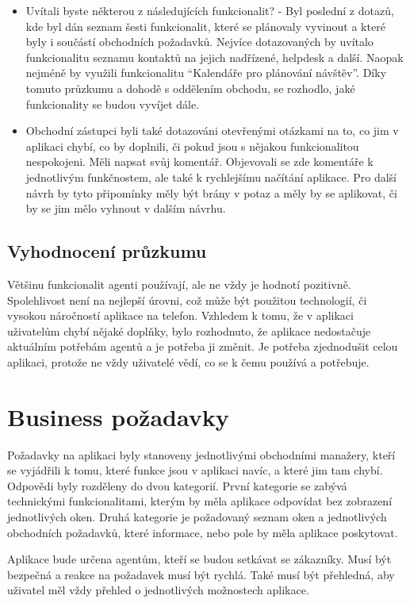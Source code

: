 \documentclass[11pt,twoside,a4paper]{book}
\begin{document}
\begin{itemize}
\item Uvítali byste některou z následujících funkcionalit? - Byl poslední z dotazů, kde byl dán seznam šesti funkcionalit, které se plánovaly vyvinout a které byly i součástí obchodních požadavků. Nejvíce dotazovaných by uvítalo funkcionalitu seznamu kontaktů na jejich nadřízené, helpdesk a další. Naopak nejméně by využili funkcionalitu “Kalendáře pro plánování návštěv”. Díky tomuto průzkumu a dohodě s oddělením obchodu, se rozhodlo, jaké funkcionality se budou vyvíjet dále. 
\item Obchodní zástupci byli také dotazováni otevřenými otázkami na to, co jim v aplikaci chybí, co by doplnili, či pokud jsou s nějakou funkcionalitou nespokojeni. Měli napsat svůj komentář. Objevovali se zde komentáře k jednotlivým funkčnostem, ale také k rychlejšímu načítání aplikace. Pro další návrh by tyto připomínky měly být brány v potaz a měly by se aplikovat, či by se jim mělo vyhnout v dalším návrhu.
\end{itemize}

\subsection{Vyhodnocení průzkumu}
Většinu funkcionalit agenti používají, ale ne vždy je hodnotí pozitivně. Spolehlivost není na nejlepší úrovni, což může být použitou technologií, či vysokou náročností aplikace na telefon. Vzhledem k tomu, že v aplikaci uživatelům chybí nějaké doplňky, bylo rozhodnuto, že aplikace nedostačuje aktuálním potřebám agentů a je potřeba ji změnit. Je potřeba zjednodušit celou aplikaci, protože ne vždy uživatelé vědí, co se k čemu používá a potřebuje.

\section{Business požadavky}
Požadavky na aplikaci byly stanoveny jednotlivými obchodními manažery, kteří se vyjádřili k tomu, které funkce jsou v aplikaci navíc, a které jim tam chybí. Odpovědi byly rozděleny do dvou kategorií. První kategorie se zabývá technickými funkcionalitami, kterým by měla aplikace odpovídat bez zobrazení jednotlivých oken. Druhá kategorie je požadovaný seznam oken a jednotlivých obchodních požadavků, které informace, nebo pole by měla aplikace poskytovat. 

Aplikace bude určena agentům, kteří se budou setkávat se zákazníky. Musí být bezpečná a reakce na požadavek musí být rychlá. Také musí být přehledná, aby uživatel měl vždy přehled o jednotlivých možnostech aplikace.
\end{document}
